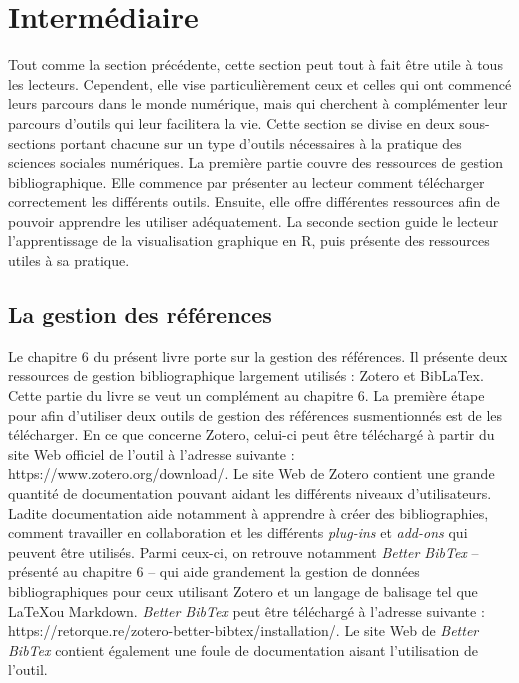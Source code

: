 \documentclass[
  letterpaper,
]{scrbook}
\begin{document}
\hypertarget{intermuxe9diaire}{%
\section{Intermédiaire}\label{intermuxe9diaire}}

Tout comme la section précédente, cette section peut tout à fait être
utile à tous les lecteurs. Cependent, elle vise particulièrement ceux et
celles qui ont commencé leurs parcours dans le monde numérique, mais qui
cherchent à complémenter leur parcours d'outils qui leur facilitera la
vie. Cette section se divise en deux sous-sections portant chacune sur
un type d'outils nécessaires à la pratique des sciences sociales
numériques. La première partie couvre des ressources de gestion
bibliographique. Elle commence par présenter au lecteur comment
télécharger correctement les différents outils. Ensuite, elle offre
différentes ressources afin de pouvoir apprendre les utiliser
adéquatement. La seconde section guide le lecteur l'apprentissage de la
visualisation graphique en R, puis présente des ressources utiles à sa
pratique.

\hypertarget{la-gestion-des-ruxe9fuxe9rences}{%
\subsection{La gestion des
références}\label{la-gestion-des-ruxe9fuxe9rences}}

Le chapitre 6 du présent livre porte sur la gestion des références. Il
présente deux ressources de gestion bibliographique largement utilisés :
Zotero et BibLaTex. Cette partie du livre se veut un complément au
chapitre 6. La première étape pour afin d'utiliser deux outils de
gestion des références susmentionnés est de les télécharger. En ce que
concerne Zotero, celui-ci peut être téléchargé à partir du site Web
officiel de l'outil à l'adresse suivante :
https://www.zotero.org/download/. Le site Web de Zotero contient une
grande quantité de documentation pouvant aidant les différents niveaux
d'utilisateurs. Ladite documentation aide notamment à apprendre à créer
des bibliographies, comment travailler en collaboration et les
différents \emph{plug-ins} et \emph{add-ons} qui peuvent être utilisés.
Parmi ceux-ci, on retrouve notamment \emph{Better BibTex} -- présenté au
chapitre 6 -- qui aide grandement la gestion de données bibliographiques
pour ceux utilisant Zotero et un langage de balisage tel que \LaTeX ou
Markdown. \emph{Better BibTex} peut être téléchargé à l'adresse suivante
: https://retorque.re/zotero-better-bibtex/installation/. Le site Web de
\emph{Better BibTex} contient également une foule de documentation
aisant l'utilisation de l'outil.
\end{document}
